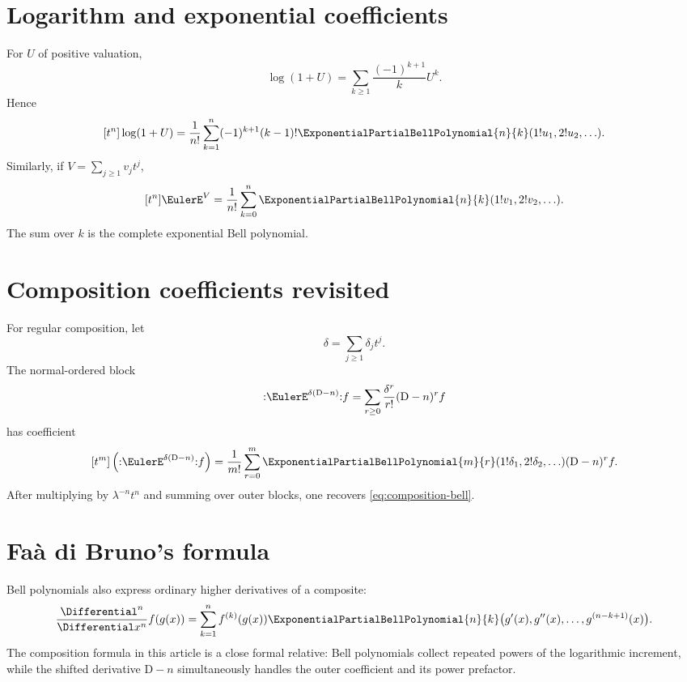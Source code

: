 \documentclass[11pt,openany]{book}
\theoremstyle{definition}
\theoremstyle{plain}
\theoremstyle{remark}
\newcommand{\Dop}{\mathrm{D}}
\begin{document}
\section{Logarithm and exponential coefficients}
For \(U\) of positive valuation,
\[
 \log(1+U)=\sum_{k\ge1}\frac{(-1)^{k+1}}kU^k.
\]
Hence
\begin{equation}\label{eq:bell-log-coeff}
 [t^n]\log(1+U)
 =\frac1{n!}\sum_{k=1}^n(-1)^{k+1}(k-1)!
 \ExponentialPartialBellPolynomial{n}{k}(1!u_1,2!u_2,\ldots).
\end{equation}
Similarly, if \(V=\sum_{j\ge1}v_jt^j\),
\begin{equation}\label{eq:bell-exp-coeff}
 [t^n]\EulerE^V
 =\frac1{n!}\sum_{k=0}^n
 \ExponentialPartialBellPolynomial{n}{k}(1!v_1,2!v_2,\ldots).
\end{equation}
The sum over \(k\) is the complete exponential Bell polynomial.

\section{Composition coefficients revisited}
For regular composition, let
\[
 \delta=\sum_{j\ge1}\delta_jt^j.
\]
The normal-ordered block
\[
 \mathopen{:}\EulerE^{\delta(\Dop-n)}\mathclose{:}f
 =\sum_{r\ge0}\frac{\delta^r}{r!}(\Dop-n)^rf
\]
has coefficient
\begin{equation}\label{eq:bell-normal-block}
 [t^m]\left(
 \mathopen{:}\EulerE^{\delta(\Dop-n)}\mathclose{:}f
 \right)
 =\frac1{m!}\sum_{r=0}^m
 \ExponentialPartialBellPolynomial{m}{r}(1!\delta_1,2!\delta_2,\ldots)
 (\Dop-n)^rf.
\end{equation}
After multiplying by \(\lambda^{-n}t^n\) and summing over outer blocks, one
recovers \cref{eq:composition-bell}.

\section{Faà di Bruno's formula}
Bell polynomials also express ordinary higher derivatives of a composite:
\begin{equation}\label{eq:faa-di-bruno}
 \frac{\Differential^n}{\Differential x^n}f(g(x))
 =\sum_{k=1}^nf^{(k)}(g(x))
 \ExponentialPartialBellPolynomial{n}{k}\bigl(g'(x),g''(x),\ldots,g^{(n-k+1)}(x)\bigr).
\end{equation}
The composition formula in this article is a close formal relative: Bell
polynomials collect repeated powers of the logarithmic increment, while the
shifted derivative \(\Dop-n\) simultaneously handles the outer coefficient and
its power prefactor.
\end{document}
